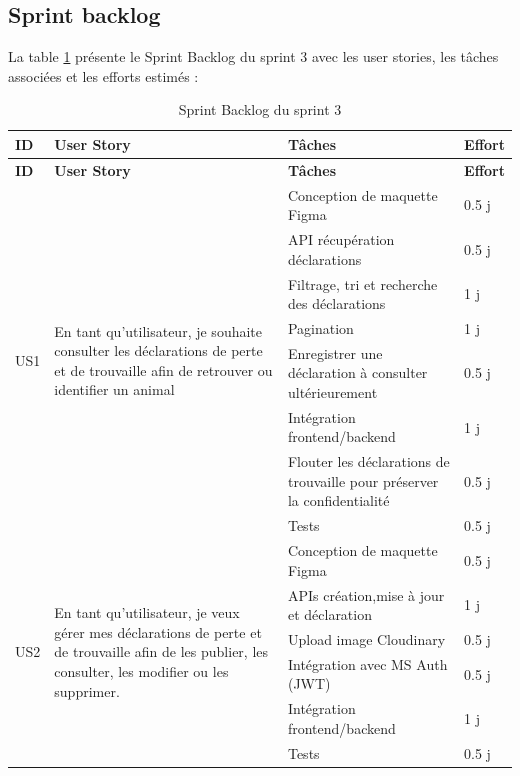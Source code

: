 \subsection{Sprint backlog}  
La table \ref{tab:sprint3-backlog} présente le Sprint Backlog du sprint 3 avec les user stories, les tâches associées et les efforts estimés :
\begin{longtable}{|p{2cm}|p{5cm}|p{6cm}|p{2cm}|}
\caption{Sprint Backlog du sprint 3 }
\label{tab:sprint3-backlog} \\ 
\hline
\rowcolor{coloranifound}
\textbf{ID} & \textbf{User Story} & \textbf{Tâches} & \textbf{Effort} \\
\hline
\endfirsthead

\hline
\rowcolor{coloranifound}
\textbf{ID} & \textbf{User Story} & \textbf{Tâches} & \textbf{Effort} \\
\hline
\endhead

\multirow{8}{2cm}{US1}
& \multirow{8}{5cm}{En tant qu’utilisateur, je souhaite consulter les déclarations de perte et de trouvaille afin de retrouver ou identifier un animal}
& Conception de maquette Figma & 0.5 j \\
\cline{3-4}
& & API récupération déclarations & 0.5 j \\
\cline{3-4}
& & Filtrage, tri et recherche des déclarations & 1 j \\
\cline{3-4}
& &Pagination & 1 j \\
\cline{3-4}
& & Enregistrer une déclaration à consulter ultérieurement & 0.5 j \\ 
\cline{3-4}
& & Intégration frontend/backend & 1 j \\
\cline{3-4}
& & Flouter les déclarations de trouvaille pour préserver la confidentialité & 0.5 j \\ 
\cline{3-4}
& & Tests & 0.5 j \\
\hline

\multirow{9}{2cm}{US2}
& \multirow{9}{5cm}{En tant qu’utilisateur, je veux gérer mes déclarations de perte et de trouvaille afin de les publier, les consulter, les modifier ou les supprimer.}
& Conception de maquette Figma & 0.5 j \\
\cline{3-4}
& & APIs création,mise à jour et déclaration & 1 j \\
\cline{3-4}
& & Upload image Cloudinary & 0.5 j \\
\cline{3-4}
& & Intégration avec MS Auth (JWT) & 0.5 j \\
\cline{3-4}
& & Intégration frontend/backend & 1 j \\ 
\cline{3-4}
& & Tests & 0.5 j \\    
\hline


\end{longtable}
